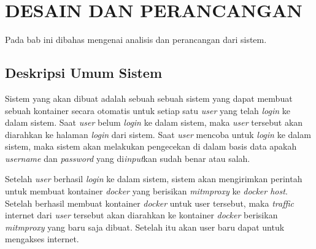 \chapter{DESAIN DAN PERANCANGAN}
  Pada bab ini dibahas mengenai analisis dan perancangan dari sistem. 
  \section{Deskripsi Umum Sistem}    
    Sistem yang akan dibuat adalah sebuah sebuah sistem yang dapat membuat sebuah kontainer secara otomatis untuk setiap satu \textit{user} yang telah \textit{login} ke dalam sistem. Saat \textit{user} belum \textit{login} ke dalam sistem, maka \textit{user} tersebut akan diarahkan ke halaman \textit{login} dari sistem. Saat \textit{user} mencoba untuk \textit{login} ke dalam sistem, maka sistem akan melakukan pengecekan di dalam basis data apakah \textit{username} dan \textit{password} yang di\textit{input}kan sudah benar atau salah. 
    
    Setelah \textit{user} berhasil \textit{login} ke dalam sistem, sistem akan mengirimkan perintah untuk membuat kontainer \textit{docker} yang berisikan \textit{mitmproxy} ke \textit{docker host}. Setelah berhasil membuat kontainer \textit{docker} untuk user tersebut, maka \textit{traffic} internet dari \textit{user} tersebut akan diarahkan ke kontainer \textit{docker} berisikan \textit{mitmproxy} yang baru saja dibuat. Setelah itu akan user baru dapat untuk mengakses internet.
  
